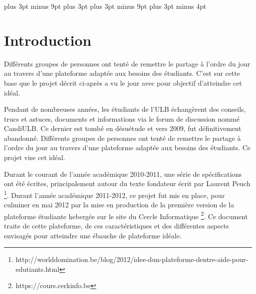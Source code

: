 \documentclass[a4paper,12pt]{article}
\begin{document}
\setlength{\footskip}{40pt}

\abovedisplayskip=9pt plus 3pt minus 9pt
\abovedisplayshortskip=6pt plus 3pt
\belowdisplayskip=9pt plus 3pt minus 9pt
\belowdisplayshortskip=9pt plus 3pt minus 4pt
\setlength{\parskip}{0.5ex plus 0.2ex minus 0.2ex}
\setlength{\parindent}{0pt}

\newpage
\setlength{\voffset}{0pt}
\setcounter{tocdepth}{2}
\tableofcontents

\newpage

\section{Introduction}


Différents groupes de personnes ont tenté de remettre le partage à l'ordre du jour 
au travers d'une plateforme adaptée aux besoins des étudiants. C'est sur cette base que le projet décrit ci-après a vu
le jour avec pour objectif d'atteindre cet idéal.

Pendant de nombreuses années, les étudiants de l'ULB échangèrent des conseils, trucs et astuces,
documents et informations via le forum de discussion nommé CandiULB. Ce dernier est tombé en désuétude et vers 2009,
fut définitivement abandonné.
Différents groupes de personnes ont tenté de remettre le partage à l'ordre du jour 
au travers d'une plateforme adaptée aux besoins des étudiants. Ce projet vise cet idéal.

Durant le courant de l'année académique 2010-2011, une série de spécifications ont été écrites,
principalement autour du texte fondateur écrit par Laurent Peuch
\footnote{http://worlddomination.be/blog/2012/idee-dun-plateforme-dentre-aide-pour-edutiants.html}.
Durant l'année académique 2011-2012, ce projet fut mis en place, pour culminer en mai 2012
par la mise en production de la première version de la plateforme étudiante hebergée sur le site du Cercle Informatique
\footnote{https://cours.cerkinfo.be}. Ce document traite de cette plateforme, de ces caractéristiques et des différentes
aspects envisagés pour atteindre une ébauche de plateforme idéale.
\end{document}
